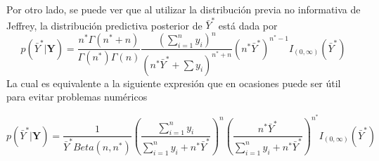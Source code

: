     Por otro lado, se puede ver que al utilizar la distribuci\'on previa no informativa de Jeffrey, la distribuci\'on predictiva posterior de $\bar{Y}^*$ est\'a dada por
    \begin{equation}\label{pred_expo_Jeffreys1}
    p(\bar{Y}^*|\mathbf{Y})=\frac{n^*\Gamma(n^*+n)}{\Gamma(n^*)\Gamma(n)}\frac{(\sum_{i=1}^ny_i)^n}{(n^*\bar{Y}^*+\sum y_i)^{n^*+n}}(n^*\bar{Y}^*)^{n^*-1}I_{(0,\infty)}(\bar{Y}^*)
    \end{equation}
    La cual es equivalente a la siguiente expresi\'on que en ocasiones puede ser \'util para evitar problemas num\'ericos
    
    \begin{equation}\label{pred_expo_Jeffreys2}
    p(\bar{Y}^*|\mathbf{Y})=\frac{1}{\bar{Y}^*Beta(n,n^*)}\left(\frac{\sum_{i=1}^ny_i}{\sum_{i=1}^ny_i+n^*\bar{Y}^*}\right)^n\left(\frac{n^*\bar{Y}^*}{\sum_{i=1}^ny_i+n^*\bar{Y}^*}\right)^{n^*}I_{(0,\infty)}(\bar{Y}^*)
    \end{equation}
    

